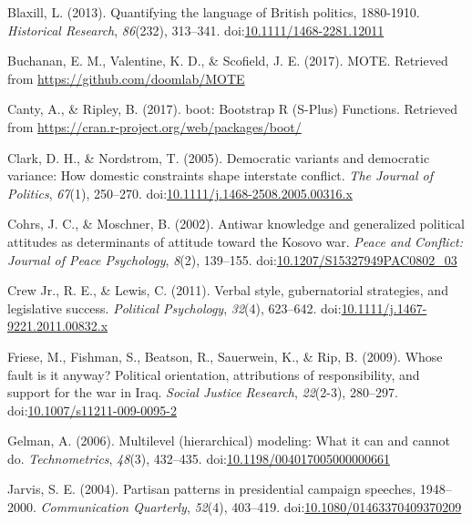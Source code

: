 \documentclass[english,man]{apa6}
\theoremstyle{definition}
\theoremstyle{definition}
\theoremstyle{definition}
\theoremstyle{remark}
\begin{document}
\hypertarget{ref-Blaxill2013}{}
Blaxill, L. (2013). Quantifying the language of British politics,
1880-1910. \emph{Historical Research}, \emph{86}(232), 313--341.
doi:\href{https://doi.org/10.1111/1468-2281.12011}{10.1111/1468-2281.12011}

\hypertarget{ref-Buchanan2017}{}
Buchanan, E. M., Valentine, K. D., \& Scofield, J. E. (2017). MOTE.
Retrieved from \url{https://github.com/doomlab/MOTE}

\hypertarget{ref-Canty2017}{}
Canty, A., \& Ripley, B. (2017). boot: Bootstrap R (S-Plus) Functions.
Retrieved from \url{https://cran.r-project.org/web/packages/boot/}

\hypertarget{ref-Clark2005}{}
Clark, D. H., \& Nordstrom, T. (2005). Democratic variants and
democratic variance: How domestic constraints shape interstate conflict.
\emph{The Journal of Politics}, \emph{67}(1), 250--270.
doi:\href{https://doi.org/10.1111/j.1468-2508.2005.00316.x}{10.1111/j.1468-2508.2005.00316.x}

\hypertarget{ref-Cohrs2002}{}
Cohrs, J. C., \& Moschner, B. (2002). Antiwar knowledge and generalized
political attitudes as determinants of attitude toward the Kosovo war.
\emph{Peace and Conflict: Journal of Peace Psychology}, \emph{8}(2),
139--155.
doi:\href{https://doi.org/10.1207/S15327949PAC0802_03}{10.1207/S15327949PAC0802\_03}

\hypertarget{ref-Crew2011}{}
Crew Jr., R. E., \& Lewis, C. (2011). Verbal style, gubernatorial
strategies, and legislative success. \emph{Political Psychology},
\emph{32}(4), 623--642.
doi:\href{https://doi.org/10.1111/j.1467-9221.2011.00832.x}{10.1111/j.1467-9221.2011.00832.x}

\hypertarget{ref-Friese2009}{}
Friese, M., Fishman, S., Beatson, R., Sauerwein, K., \& Rip, B. (2009).
Whose fault is it anyway? Political orientation, attributions of
responsibility, and support for the war in Iraq. \emph{Social Justice
Research}, \emph{22}(2-3), 280--297.
doi:\href{https://doi.org/10.1007/s11211-009-0095-2}{10.1007/s11211-009-0095-2}

\hypertarget{ref-Gelman2006}{}
Gelman, A. (2006). Multilevel (hierarchical) modeling: What it can and
cannot do. \emph{Technometrics}, \emph{48}(3), 432--435.
doi:\href{https://doi.org/10.1198/004017005000000661}{10.1198/004017005000000661}

\hypertarget{ref-Jarvis2004}{}
Jarvis, S. E. (2004). Partisan patterns in presidential campaign
speeches, 1948--2000. \emph{Communication Quarterly}, \emph{52}(4),
403--419.
doi:\href{https://doi.org/10.1080/01463370409370209}{10.1080/01463370409370209}
\end{document}
